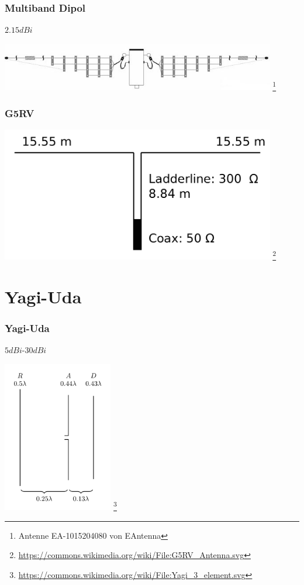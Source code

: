 \begin{frame}
    \frametitle{Multiband Dipol}
    $2.15dBi$
    \begin{center}
        \includegraphics[width=0.9\textwidth]{e11/Multiband.jpg}
        \footnote{\tiny Antenne EA-1015204080 von EAntenna}
	\end{center}
\end{frame}

\begin{frame}
    \frametitle{G5RV}
    \begin{center}
        \includegraphics[width=0.9\textwidth]{e11/G5RV_Antenna.png}
        \footnote{\tiny \url{https://commons.wikimedia.org/wiki/File:G5RV_Antenna.svg}}
	\end{center}
\end{frame}


\section*{Yagi-Uda}

\begin{frame}
    \frametitle{Yagi-Uda}
    $5dBi$-$30dBi$
    \begin{center}
        \includegraphics[width=0.36\textwidth]{e11/Yagi_3_element.png}
        \footnote{\tiny \url{https://commons.wikimedia.org/wiki/File:Yagi_3_element.svg}}
	\end{center}
\end{frame}


